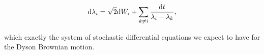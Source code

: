 \begin{equation*}
    \mathrm d \lambda_i = \sqrt{2}\mathrm d W_i + \sum_{k\neq i} \frac{\mathrm d t}{\lambda_i - \lambda_k},
\end{equation*}

\noindent which exactly the system of stochastic differential equations we expect to have for the Dyson Brownian motion.











